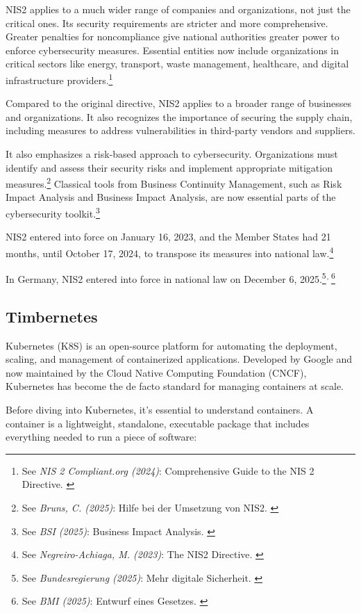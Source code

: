 NIS2 applies to a much wider range of companies and organizations, not just the critical ones. Its security requirements are stricter and more comprehensive. Greater penalties for noncompliance give national authorities greater power to enforce cybersecurity measures. Essential entities now include organizations in critical sectors like energy, transport, waste management, healthcare, and digital infrastructure providers.\footnote{See \textit{NIS 2 Compliant.org (2024)}: Comprehensive Guide to the NIS 2 Directive. \cite{nisGuide}}

Compared to the original directive, NIS2 applies to a broader range of businesses and organizations. It also recognizes the importance of securing the supply chain, including measures to address vulnerabilities in third-party vendors and suppliers.

It also emphasizes a risk-based approach to cybersecurity. Organizations must identify and assess their security risks and implement appropriate mitigation measures.\footnote {See \textit{Bruns, C. (2025)}: Hilfe bei der Umsetzung von NIS2. \cite{heiseNis2}} Classical tools from Business Continuity Management, such as Risk Impact Analysis and Business Impact Analysis, are now essential parts of the cybersecurity toolkit.\footnote{See \textit{BSI (2025)}: Business Impact Analysis. \cite{bsiBCM}}

NIS2 entered into force on January 16, 2023, and the Member States had 21 months, until October 17, 2024, to transpose its measures into national law.\footnote{See \textit{Negreiro-Achiaga, M. (2023)}: The NIS2 Directive. \cite{nisBrief}}

In Germany, NIS2 entered into force in national law on December 6, 2025.\footnote{See \textit{Bundesregierung (2025)}: Mehr digitale Sicherheit. \cite{nis2Breg}}$^{,\thinspace}$\footnote{See \textit{BMI (2025)}: Entwurf eines Gesetzes. \cite{nis2Umsucg}}

\subsection{Timbernetes}

Kubernetes (K8S) is an open-source platform for automating the deployment, scaling, and management of containerized applications. Developed by Google and now maintained by the Cloud Native Computing Foundation (CNCF), Kubernetes has become the de facto standard for managing containers at scale.

Before diving into Kubernetes, it's essential to understand containers. A container is a lightweight, standalone, executable package that includes everything needed to run a piece of software:

